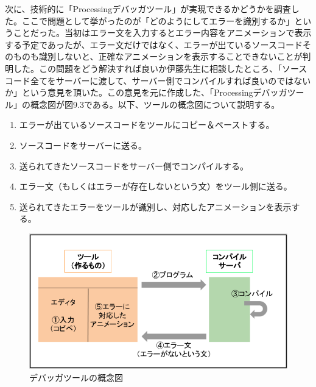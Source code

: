 \documentclass[openany,11pt,papersize]{jsbook}
\begin{document}
\par 次に、技術的に「Processingデバッガツール」が実現できるかどうかを調査した。ここで問題として挙がったのが「どのようにしてエラーを識別するか」ということだった。当初はエラー文を入力するとエラー内容をアニメーションで表示する予定であったが、エラー文だけではなく、エラーが出ているソースコードそのものも識別しないと、正確なアニメーションを表示することできないことが判明した。この問題をどう解決すれば良いか伊藤先生に相談したところ、「ソースコード全てをサーバーに渡して、サーバー側でコンパイルすれば良いのではないか」という意見を頂いた。この意見を元に作成した、「Processingデバッガツール」の概念図が図9.3である。以下、ツールの概念図について説明する。
\begin{enumerate}
\item エラーが出ているソースコードをツールにコピー＆ペーストする。
\item ソースコードをサーバーに送る。
\item 送られてきたソースコードをサーバー側でコンパイルする。
\item エラー文（もしくはエラーが存在しないという文）をツール側に送る。
\item 送られてきたエラーをツールが識別し、対応したアニメーションを表示する。
\end{enumerate}

\begin{figure}[H]
\begin{center}
\includegraphics[width=12cm, bb=0 0 649 340]{img/debuggerConcept.png}
\end{center}
\caption{デバッガツールの概念図}
\end{figure}
\end{document}
